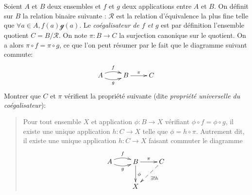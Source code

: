 

\begin{exercice}

\end{exercice}

\begin{exercice}[Coégalisateur]
Soient $A$ et $B$ deux ensembles et $f$ et $g$ deux applications entre $A$ et $B$. On définit sur $B$ la relation binaire suivante : $\mathcal R$ est la relation d'équivalence la plus fine telle que $\forall a\in A, f(a)\mathcal g(a)$. Le \emph{coégalisateur de $f$ et $g$} est par définition l'ensemble quotient $C = B/\mathcal R$. On note $\pi : B \to C$ la surjection canonique sur le quotient. On a alors $\pi\circ f = \pi \circ g$, ce que l'on peut résumer par le fait que le diagramme suivant commute:
\[
\xymatrix{
 A\ar@/^/[r] ^{f} \ar@/_/[r]_{g} & B \ar[r]^{\pi} & C
}
\]
Montrer que $C$ et $\pi$ vérifient la propriété suivante (dite \emph{propriété universelle du coégalisateur}):
\begin{quote}
Pour tout ensemble $X$ et application $\phi : B \to X$ vérifiant $\phi\circ f = \phi\circ g$,  il existe une unique application $h : C\to X$ telle que $\phi = h \circ \pi $. Autrement dit, il existe une unique application $h : C\to X$ faisant commuter le diagramme 
\[
\xymatrix{
 A\ar@/^/[r] ^{f} \ar@/_/[r]_{g} & B \ar[r]^{\pi} \ar[d]^{\phi}& C\ar@{-->}[dl]^{\exists!h}\\
 & X & 
}
\]
\end{quote}
\end{exercice}




